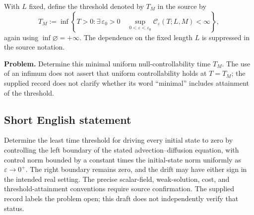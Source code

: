 \documentclass[11pt]{article}
\begin{document}
With \(L\) fixed, define the threshold denoted by \(T_M\) in the source by
\[
T_M:=\inf\left\{T>0:
\exists\,\varepsilon_0>0\quad
\sup_{0<\varepsilon<\varepsilon_0}
\mathcal C_{\varepsilon}(T;L,M)<\infty\right\},
\]
again using \(\inf\varnothing=+\infty\). The dependence on the fixed length \(L\) is suppressed in the source notation.

\textbf{Problem.} Determine this minimal uniform null-controllability time \(T_M\). The use of an infimum does not assert that uniform controllability holds at \(T=T_M\); the supplied record does not clarify whether its word ``minimal'' includes attainment of the threshold.
\subsection{Short English statement}
Determine the least time threshold for driving every initial state to zero by controlling the left boundary of the stated advection--diffusion equation, with control norm bounded by a constant times the initial-state norm uniformly as \(\varepsilon\to0^+\). The right boundary remains zero, and the drift may have either sign in the intended real setting. The precise scalar-field, weak-solution, cost, and threshold-attainment conventions require source confirmation. The supplied record labels the problem open; this draft does not independently verify that status.
\end{document}
